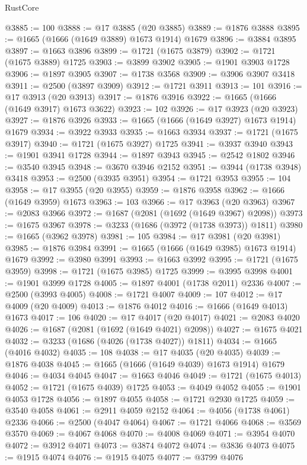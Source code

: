 \begin{lexlean}{RustCore}
\begin{coremodule}
@3885 := 100
@3888 := @17 @3885 (@20 @3885)
@3889 := @1876 @3888
@3895 := @1665 (@1666 (@1649 @3889) @1673 @1914) @1679
@3896 := @3884 @3895
@3897 := @1663 @3896
@3899 := @1721 (@1675 @3879)
@3902 := @1721 (@1675 @3889) @1725
@3903 := @3899 @3902
@3905 := @1901 @3903 @1728
@3906 := @1897 @3905
@3907 := @1738 @3568
@3909 := @3906 @3907 @3418
@3911 := @2500 (@3897 @3909)
@3912 := @1721 @3911
@3913 := 101
@3916 := @17 @3913 (@20 @3913)
@3917 := @1876 @3916
@3922 := @1665 (@1666 (@1649 @3917) @1673 @3622)
@3923 := 102
@3926 := @17 @3923 (@20 @3923)
@3927 := @1876 @3926
@3933 := @1665 (@1666 (@1649 @3927) @1673 @1914) @1679
@3934 := @3922 @3933
@3935 := @1663 @3934
@3937 := @1721 (@1675 @3917)
@3940 := @1721 (@1675 @3927) @1725
@3941 := @3937 @3940
@3943 := @1901 @3941 @1728
@3944 := @1897 @3943
@3945 := @2542 @1802
@3946 := @3540 @3945
@3948 := @3670 @3946 @2152
@3951 := @3944 (@1738 @3948) @3418
@3953 := @2500 (@3935 @3951)
@3954 := @1721 @3953
@3955 := 104
@3958 := @17 @3955 (@20 @3955)
@3959 := @1876 @3958
@3962 := @1666 (@1649 @3959) @1673
@3963 := 103
@3966 := @17 @3963 (@20 @3963)
@3967 := @2083 @3966
@3972 := @1687 (@2081 (@1692 (@1649 @3967) @2098))
@3973 := @1675 @3967
@3978 := @3233 (@1686 (@3972 (@1738 @3973)) @1811)
@3980 := @1665 (@3962 @3978)
@3981 := 105
@3984 := @17 @3981 (@20 @3981)
@3985 := @1876 @3984
@3991 := @1665 (@1666 (@1649 @3985) @1673 @1914) @1679
@3992 := @3980 @3991
@3993 := @1663 @3992
@3995 := @1721 (@1675 @3959)
@3998 := @1721 (@1675 @3985) @1725
@3999 := @3995 @3998
@4001 := @1901 @3999 @1728
@4005 := @1897 @4001 (@1738 @2011) @2336
@4007 := @2500 (@3993 @4005)
@4008 := @1721 @4007
@4009 := 107
@4012 := @17 @4009 (@20 @4009)
@4013 := @1876 @4012
@4016 := @1666 (@1649 @4013) @1673
@4017 := 106
@4020 := @17 @4017 (@20 @4017)
@4021 := @2083 @4020
@4026 := @1687 (@2081 (@1692 (@1649 @4021) @2098))
@4027 := @1675 @4021
@4032 := @3233 (@1686 (@4026 (@1738 @4027)) @1811)
@4034 := @1665 (@4016 @4032)
@4035 := 108
@4038 := @17 @4035 (@20 @4035)
@4039 := @1876 @4038
@4045 := @1665 (@1666 (@1649 @4039) @1673 @1914) @1679
@4046 := @4034 @4045
@4047 := @1663 @4046
@4049 := @1721 (@1675 @4013)
@4052 := @1721 (@1675 @4039) @1725
@4053 := @4049 @4052
@4055 := @1901 @4053 @1728
@4056 := @1897 @4055
@4058 := @1721 @2930 @1725
@4059 := @3540 @4058
@4061 := @2911 @4059 @2152
@4064 := @4056 (@1738 @4061) @2336
@4066 := @2500 (@4047 @4064)
@4067 := @1721 @4066
@4068 := @3569 @3570
@4069 := @4067 @4068
@4070 := @4008 @4069
@4071 := @3954 @4070
@4072 := @3912 @4071
@4073 := @3874 @4072
@4074 := @3836 @4073
@4075 := @1915 @4074
@4076 := @1915 @4075
@4077 := @3799 @4076

\end{coremodule}
\end{lexlean}
